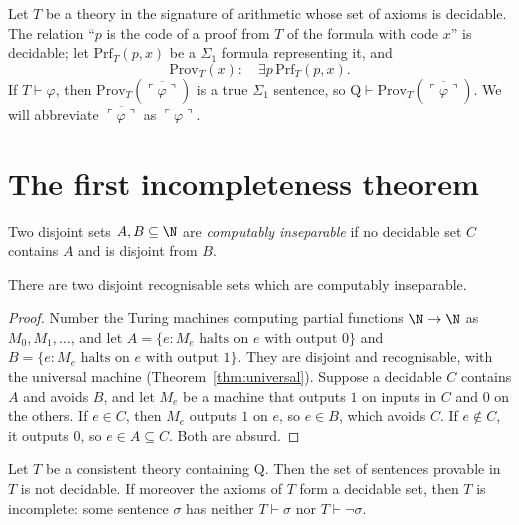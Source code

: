 Let $T$ be a theory in the signature of arithmetic whose set of axioms is decidable. The relation ``$p$ is the code of a proof from $T$ of the formula with code $x$'' is decidable; let $\mathrm{Prf}_T(p,x)$ be a $\Sigma_1$ formula representing it, and
\[
\mathrm{Prov}_T(x):\quad\exists p\,\mathrm{Prf}_T(p,x).
\]
If $T\vdash\varphi$, then $\mathrm{Prov}_T(\overline{\ulcorner\varphi\urcorner})$ is a true $\Sigma_1$ sentence, so $\mathrm Q\vdash\mathrm{Prov}_T(\overline{\ulcorner\varphi\urcorner})$. We will abbreviate $\overline{\ulcorner\varphi\urcorner}$ as $\ulcorner\varphi\urcorner$.

\section{The first incompleteness theorem}\label{sec:first}

Two disjoint sets $A,B\subseteq\N$ are \emph{computably inseparable} if no decidable set $C$ contains $A$ and is disjoint from $B$.

\begin{lemma}\label{lem:inseparable}
There are two disjoint recognisable sets which are computably inseparable.
\end{lemma}

\begin{proof}
Number the Turing machines computing partial functions $\N\to\N$ as $M_0,M_1,\dots$, and let $A=\{e:M_e\text{ halts on }e\text{ with output }0\}$ and $B=\{e:M_e\text{ halts on }e\text{ with output }1\}$. They are disjoint and recognisable, with the universal machine (Theorem~\ref{thm:universal}). Suppose a decidable $C$ contains $A$ and avoids $B$, and let $M_e$ be a machine that outputs $1$ on inputs in $C$ and $0$ on the others. If $e\in C$, then $M_e$ outputs $1$ on $e$, so $e\in B$, which avoids $C$. If $e\notin C$, it outputs $0$, so $e\in A\subseteq C$. Both are absurd.
\end{proof}

\begin{theorem}\label{thm:firstincompleteness}
Let $T$ be a consistent theory containing $\mathrm Q$. Then the set of sentences provable in $T$ is not decidable. If moreover the axioms of $T$ form a decidable set, then $T$ is incomplete: some sentence $\sigma$ has neither $T\vdash\sigma$ nor $T\vdash\neg\sigma$.
\end{theorem}

